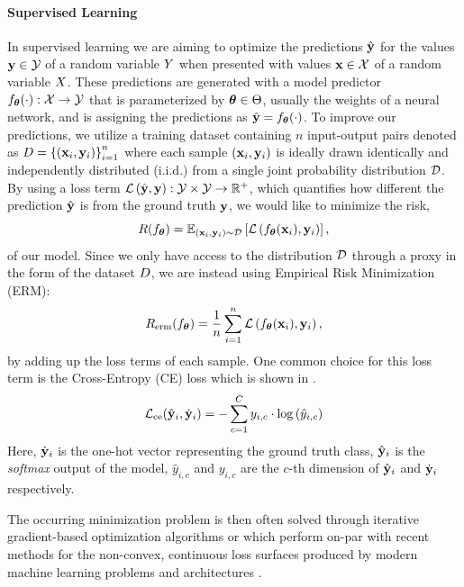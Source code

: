 \paragraph{Supervised Learning}
In supervised learning we are aiming to optimize the predictions $\hat{\mathbf{y}}$ for the values $\mathbf{y} \in \mathcal{Y}$ of a random variable $Y$ when presented with values $\mathbf{x} \in \mathcal{X}$ of a random variable $X$. These predictions are generated with a model predictor $f_{\boldsymbol{\theta}}(\cdot): \mathcal{X} \rightarrow \mathcal{Y}$ that is parameterized by $\boldsymbol{\theta} \in \Theta$, usually the weights of a neural network,  and is assigning the predictions as $\hat{\mathbf{y}}=f_{\boldsymbol{\theta}}(\cdot)$. To improve our predictions, we utilize a training dataset containing $n$ input-output pairs denoted as $D=\left\{\left(\mathbf{x}_i, \mathbf{y}_i \right)\right\}_{i=1}^{n}$ where each sample $(\mathbf{x}_i, \mathbf{y}_i)$ is ideally drawn identically and independently distributed (i.i.d.) from a single joint probability distribution $\mathcal{D}$. By using a loss term $\mathcal{L}\left(\hat{\mathbf{y}}, \mathbf{y}\right): \mathcal{Y} \times \mathcal{Y} \rightarrow \mathbb{R}^{+}$, which quantifies how different the prediction $\hat{\mathbf{y}}$ is from the ground truth $\mathbf{y}$, we would like to minimize the risk,
\begin{equation}
    R(f_{\boldsymbol{\theta}}) = \mathbb{E}_{(\mathbf{x}_i, \mathbf{y}_i) \sim \mathcal{D}}\left[\mathcal{L}\left(f_{\boldsymbol{\theta}}(\mathbf{x}_i), \mathbf{y}_i\right)\right],
\end{equation}
of our model. Since we only have access to the distribution $\mathcal{D}$ through a proxy in the form of the dataset $D$, we are instead using Empirical Risk Minimization (ERM):
\begin{equation}
    R_{\mathrm{erm}}(f_{\boldsymbol{\theta}}) =\frac{1}{n} \sum_{i=1}^n \mathcal{L}\left(f_{\boldsymbol{\theta}}(\mathbf{x}_i), \mathbf{y}_i\right),
\end{equation}
by adding up the loss terms of each sample. One common choice for this loss term is the Cross-Entropy (CE) loss which is shown in .
\begin{equation}
\label{eq:cross_entropy}
    \mathcal{L}_{\mathrm{ce}}(\hat{\mathbf{y}}_i, \dot{\mathbf{y}}_i)=-\sum_{c=1}^{C} y_{i, c} \cdot \log \left(\hat{y}_{i, c}\right)
\end{equation}
Here, $\dot{\mathbf{y}}_i$ is the one-hot vector representing the ground truth class, $\hat{\mathbf{y}}_i$ is the \emph{softmax} output of the model, $\hat{y}_{i, c}$ and $y_{i, c}$ are the $c$-th dimension of $\hat{\mathbf{y}}_i$ and $\dot{\mathbf{y}}_i$ respectively.

The occurring minimization problem is then often solved through iterative gradient-based optimization algorithms \eg \sgd{} \citep{Robbins1951} or \adam \citep{Kingma2015} which perform on-par with recent methods for the non-convex, continuous loss surfaces produced by modern machine learning problems and architectures \citep{schmidt2020descending}.

